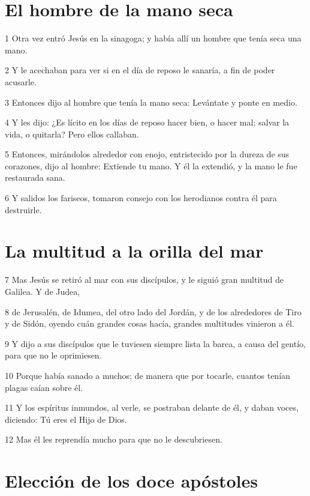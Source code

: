 \section*{El hombre de la mano seca}

\par 1 Otra vez entró Jesús en la sinagoga; y había allí un hombre que tenía seca una mano.
\par 2 Y le acechaban para ver si en el día de reposo le sanaría, a fin de poder acusarle.
\par 3 Entonces dijo al hombre que tenía la mano seca: Levántate y ponte en medio.
\par 4 Y les dijo: ¿Es lícito en los días de reposo hacer bien, o hacer mal; salvar la vida, o quitarla? Pero ellos callaban.
\par 5 Entonces, mirándolos alrededor con enojo, entristecido por la dureza de sus corazones, dijo al hombre: Extiende tu mano. Y él la extendió, y la mano le fue restaurada sana.
\par 6 Y salidos los fariseos, tomaron consejo con los herodianos contra él para destruirle.

\section*{La multitud a la orilla del mar}

\par 7 Mas Jesús se retiró al mar con sus discípulos, y le siguió gran multitud de Galilea. Y de Judea,
\par 8 de Jerusalén, de Idumea, del otro lado del Jordán, y de los alrededores de Tiro y de Sidón, oyendo cuán grandes cosas hacía, grandes multitudes vinieron a él.
\par 9 Y dijo a sus discípulos que le tuviesen siempre lista la barca, a causa del gentío, para que no le oprimiesen.
\par 10 Porque había sanado a muchos; de manera que por tocarle, cuantos tenían plagas caían sobre él.
\par 11 Y los espíritus inmundos, al verle, se postraban delante de él, y daban voces, diciendo: Tú eres el Hijo de Dios.
\par 12 Mas él les reprendía mucho para que no le descubriesen.

\section*{Elección de los doce apóstoles}

